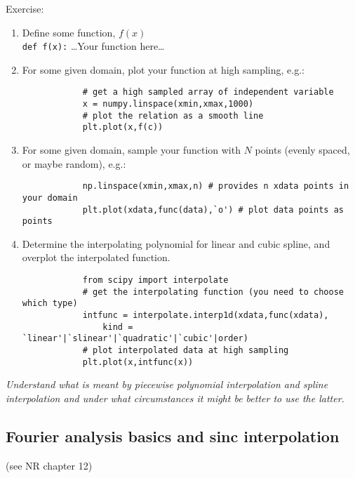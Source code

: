 \documentclass{article}
\newcommand{\test}[1]{%
    \begin{center}
        \colorbox{hl}{\parbox{0.9\textwidth}{\emph{\centering #1}}}
    \end{center}}
\begin{document}
\begin{framed}
    Exercise:
    \begin{enumerate}
        \item Define some function, $f(x)$\\
            \verb|def f(x):|
                \ldots Your function here\ldots
        \item For some given domain, plot your function at high sampling, e.g.:
            \begin{lstlisting}
            # get a high sampled array of independent variable
            x = numpy.linspace(xmin,xmax,1000)
            # plot the relation as a smooth line
            plt.plot(x,f(c))
            \end{lstlisting}
        \item For some given domain, sample your function with $N$ points
            (evenly spaced, or maybe random), e.g.:
            \begin{lstlisting}
            np.linspace(xmin,xmax,n) # provides n xdata points in your domain
            plt.plot(xdata,func(data),`o') # plot data points as points
            \end{lstlisting}
        \item Determine the interpolating polynomial for linear and cubic
            spline, and overplot the interpolated function.
            \begin{lstlisting}
            from scipy import interpolate
            # get the interpolating function (you need to choose which type)
            intfunc = interpolate.interp1d(xdata,func(xdata),
                kind = `linear'|`slinear'|`quadratic'|`cubic'|order)
            # plot interpolated data at high sampling
            plt.plot(x,intfunc(x))
            \end{lstlisting}
    \end{enumerate}
\end{framed}

\test{Understand what is meant by piecewise polynomial interpolation and
spline interpolation and under what circumstances it might be better to use
the latter.}

\subsection{Fourier analysis basics and sinc interpolation}
(see NR chapter 12)
\end{document}
